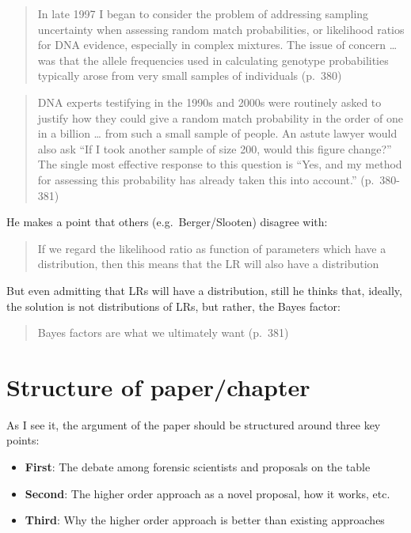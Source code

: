 \documentclass[
  10pt,
  dvipsnames,enabledeprecatedfontcommands]{scrartcl}
\begin{document}
\begin{quote}
In late 1997 I began to consider the problem of addressing sampling
uncertainty when assessing random match probabilities, or likelihood
ratios for DNA evidence, especially in complex mixtures. The issue of
concern \ldots{} was that the allele frequencies used in calculating
genotype probabilities typically arose from very small samples of
individuals (p.~380)
\end{quote}

\begin{quote}
DNA experts testifying in the 1990s and 2000s were routinely asked to
justify how they could give a random match probability in the order of
one in a billion \ldots{} from such a small sample of people. An astute
lawyer would also ask ``If I took another sample of size 200, would this
figure change?'' The single most effective response to this question is
``Yes, and my method for assessing this probability has already taken
this into account.'' (p.~380-381)
\end{quote}

He makes a point that others (e.g.~Berger/Slooten) disagree with:

\begin{quote}
If we regard the likelihood ratio as function of parameters which have a
distribution, then this means that the LR will also have a distribution
\end{quote}

But even admitting that LRs will have a distribution, still he thinks
that, ideally, the solution is not distributions of LRs, but rather, the
Bayes factor:

\begin{quote}
Bayes factors are what we ultimately want (p.~381)
\end{quote}

\hypertarget{structure-of-paperchapter}{%
\section{Structure of paper/chapter}\label{structure-of-paperchapter}}

As I see it, the argument of the paper should be structured around three
key points:

\begin{itemize}
\item
  \textbf{First}: The debate among forensic scientists and proposals on
  the table
\item
  \textbf{Second}: The higher order approach as a novel proposal, how it
  works, etc.
\item
  \textbf{Third}: Why the higher order approach is better than existing
  approaches
\end{itemize}
\end{document}
